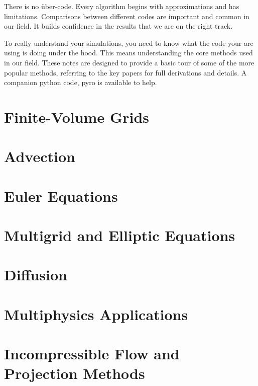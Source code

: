 \documentclass[11pt]{book}
\begin{document}
There is no \"uber-code.  Every algorithm begins with approximations
and has limitations.  Comparisons between different codes are
important and common in our field.  It builds confidence in the
results that we are on the right track.

To really understand your simulations, you need to know what the code
your are using is doing under the hood.  This means understanding the 
core methods used in our field.  These notes are designed to provide
a basic tour of some of the more popular methods, referring to the 
key papers for full derivations and details.  A companion python code,
{\sf pyro} is available to help. 




\chapter{Finite-Volume Grids}




\chapter{Advection}




\chapter{Euler Equations}




\chapter{Multigrid and Elliptic Equations}




\chapter{Diffusion}




\chapter{Multiphysics Applications}



\chapter{Incompressible Flow and Projection Methods}



\backmatter




\end{document}
